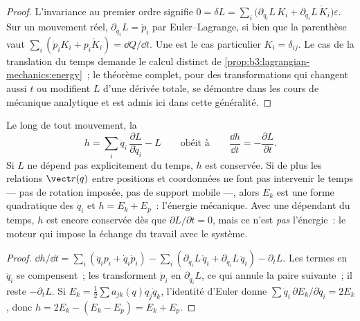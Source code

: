 \begin{proof}
L'invariance au premier ordre signifie
$0 = \delta L = \sum_i\big(\partial_{q_i}L\,K_i +
\partial_{\dot q_i}L\,\dot K_i\big)\varepsilon$. Sur un mouvement réel,
$\partial_{q_i}L = \dot p_i$ par Euler--Lagrange, si bien que la
parenthèse vaut $\sum_i(\dot p_iK_i + p_i\dot K_i) = \dd Q/\dd t$. Une
 est le cas particulier $K_i = \delta_{ij}$. Le cas
de la translation du temps demande le calcul distinct de
\cref{prop:b3:lagrangian-mechanics:energy}~; le théorème complet, pour
des transformations qui changent aussi $t$ ou modifient $L$ d'une
dérivée totale, se démontre dans les cours de mécanique analytique et
est admis ici dans cette généralité.
\end{proof}

\begin{proposition}\label{prop:b3:lagrangian-mechanics:energy}
Le long de tout mouvement, la \emph{}
\[
h = \sum_i \dot q_i\,\frac{\partial L}{\partial\dot q_i} - L
\qquad\text{obéit à}\qquad
\frac{\dd h}{\dd t} = -\frac{\partial L}{\partial t} .
\]
Si $L$ ne dépend pas explicitement du temps, $h$ est conservée. Si de
plus les relations $\vect r(q)$ entre positions et coordonnées ne font
pas intervenir le temps --- pas de rotation imposée, pas de support
mobile ---, alors $E_k$ est une forme quadratique des $\dot q_i$ et
$h = E_k + E_p$~: l'énergie mécanique. Avec une  dépendant du
temps, $h$ est encore conservée dès que $\partial L/\partial t = 0$,
mais ce n'est \emph{pas} l'énergie~: le moteur qui impose la 
échange du travail avec le système.
\end{proposition}

\begin{proof}
$\dd h/\dd t = \sum_i(\ddot q_ip_i + \dot q_i\dot p_i) -
\sum_i(\partial_{q_i}L\,\dot q_i + \partial_{\dot q_i}L\,\ddot q_i) -
\partial_tL$. Les termes en $\ddot q_i$ se compensent~; les  transforment $\dot p_i$ en $\partial_{q_i}L$, ce qui
annule la paire suivante~; il reste $-\partial_tL$. Si $E_k = \tfrac12\sum a_{jk}(q)\dot
q_j\dot q_k$, l'identité d'Euler donne $\sum\dot
q_i\,\partial E_k/\partial\dot q_i = 2E_k$, donc $h = 2E_k - (E_k - E_p)
= E_k + E_p$.
\end{proof}

